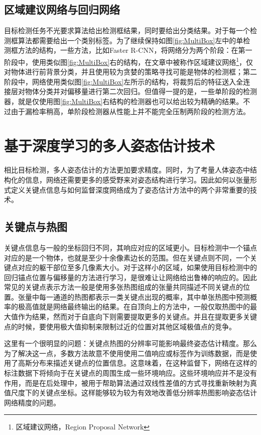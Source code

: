 \subsection{区域建议网络与回归网络}
\label{subsec:factsRPNregression}
目标检测任务不光要求算法给出检测框结果，同时要给出分类结果。对于每一个检测框算法都需要给出一个类别标签。为了继续保持如图\ref{fig:MultiBox}左中的单检测框方法的结构，一些方法，比如Faster R-CNN\cite{Ren2015Faster}，将网络分为两个阶段：在第一阶段中，使用类似图\ref{fig:MultiBox}右的结构，在文章中被称作区域建议网络\footnote{区域建议网络，Region Proposal Network}，仅对物体进行前背景分类，并且使用较为贪婪的策略寻找可能是物体的检测框；第二阶段中，网络使用类似图\ref{fig:MultiBox}左所示的结构，将裁剪后的特征送入全连接层对物体分类并对偏移量进行第二次回归。但值得一提的是，一些单阶段的检测器，就是仅使用图\ref{fig:MultiBox}右结构的检测器也可以给出较为精确的结果。不过由于漏检率稍高，单阶段检测器从性能上并不能完全压制两阶段的检测方法。

\section{基于深度学习的多人姿态估计技术}
\label{sec:factspose}
相比目标检测，多人姿态估计的方法更加要求精度。同时，为了考量人体姿态中结构化的信息，网络还需要更多的感受野来对姿态结构进行学习。因此如何以张量形式定义关键点信息与如何监督深度网络成为了姿态估计方法中的两个非常重要的技术。

\subsection{关键点与热图}
\label{subsec:factsheatmaps}
关键点信息与一般的坐标回归不同，其响应对应的区域更小。目标检测中一个锚点对应的是一个物体，也就是至少十余像素边长的范围。但在关键点则不同，一个关键点对应的躯干部位至多几像素大小。对于这样小的区域，如果使用目标检测中的回归锚点位置与偏移量的方法进行学习，是很难让让网络给出鲁棒的响应的。因此常见的关键点表示方法一般是使用多张热图组成的张量共同描述不同关键点的位置。张量中每一通道的热图都表示一类关键点出现的概率，其中单张热图中预测概率的极高值就是网络最终输出的结果。在自顶向上的方法中，一般仅取热图中的最大值作为结果，然而对于自底向下则需要提取更多的关键点。并且在提取更多关键点的时候，要使用极大值抑制来限制过近的位置对其他区域极值点的竞争。

这里有一个很明显的问题：关键点热图的分辨率可能影响最终姿态估计精度。那么为了解决这一点，多数方法故意不使用使用二值响应或标签作为训练数据，而是使用了高斯分布来描述关键点的位置信息。这意味着，在这种监督下，网络在这样的标注数据下将倾向于在关键点的周围生成一些环境响应。这些环境响应并不是没有作用，而是在后处理中，被用于帮助算法通过双线性差值的方式寻找重新映射为真值尺度下的关键点坐标。这样能够较为较为有效地改善低分辨率热图影响姿态估计网络精度的问题。

